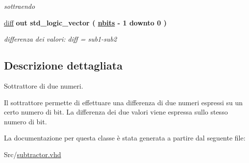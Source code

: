 \begin{DoxyCompactItemize}
\begin{DoxyCompactList}\small\item\em sottraendo \end{DoxyCompactList}\item 
\hyperlink{group___subtractor_ga0fa68103d429fdc11539b6baa81d0d0d}{diff}  {\bfseries {\bfseries \textcolor{vhdlchar}{out}\textcolor{vhdlchar}{ }}} {\bfseries \textcolor{vhdlchar}{std\+\_\+logic\+\_\+vector}\textcolor{vhdlchar}{ }\textcolor{vhdlchar}{(}\textcolor{vhdlchar}{ }\textcolor{vhdlchar}{ }\textcolor{vhdlchar}{ }\textcolor{vhdlchar}{ }{\bfseries \hyperlink{group___subtractor_gae1435c07d0cd54b521535e2f8de6f94e}{nbits}} \textcolor{vhdlchar}{-\/}\textcolor{vhdlchar}{ } \textcolor{vhdldigit}{1} \textcolor{vhdlchar}{ }\textcolor{vhdlchar}{downto}\textcolor{vhdlchar}{ }\textcolor{vhdlchar}{ } \textcolor{vhdldigit}{0} \textcolor{vhdlchar}{ }\textcolor{vhdlchar}{)}\textcolor{vhdlchar}{ }} 
\begin{DoxyCompactList}\small\item\em differenza dei valori\+: diff = sub1-\/sub2 \end{DoxyCompactList}\end{DoxyCompactItemize}


\subsection{Descrizione dettagliata}
Sottrattore di due numeri.

Il sottrattore permette di effettuare una differenza di due numeri espressi su un certo numero di bit. La differenza dei due valori viene espressa sullo stesso numero di bit. 

La documentazione per questa classe è stata generata a partire dal seguente file\+:\begin{DoxyCompactItemize}
\item 
Src/\hyperlink{subtractor_8vhd}{subtractor.\+vhd}\end{DoxyCompactItemize}
